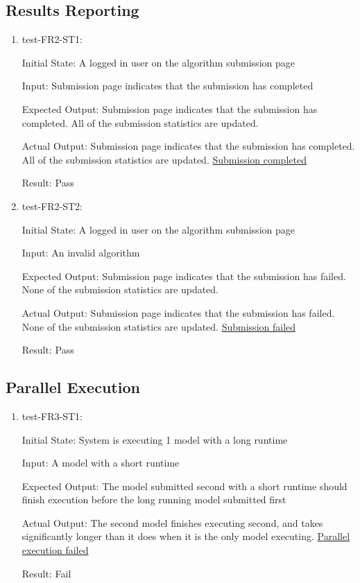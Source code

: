 \documentclass[12pt, titlepage]{article}
\begin{document}
\subsection{Results Reporting}
\begin{enumerate}
    \item test-FR2-ST1:\label{test-FR2-ST1}
    
    Initial State: A logged in user on the algorithm submission page
    
    Input: Submission page indicates that the submission has completed
    
    Expected Output: Submission page indicates that the submission has completed. All of the submission statistics are updated.
    
    Actual Output: Submission page indicates that the submission has completed. All of the submission statistics are updated. \href{https://github.com/AidanMariglia/SOCAlgoTestPlatform/blob/main/docs/VnVReport/images/submission_completed.png}{Submission completed}
    
    Result: Pass

    \item test-FR2-ST2:\label{test-FR2-ST2}
    
    Initial State: A logged in user on the algorithm submission page
    
    Input: An invalid algorithm
    
    Expected Output: Submission page indicates that the submission has failed. None of the submission statistics are updated.
    
    Actual Output: Submission page indicates that the submission has failed. None of the submission statistics are updated. \href{https://github.com/AidanMariglia/SOCAlgoTestPlatform/blob/main/docs/VnVReport/images/submission_failed.png}{Submission failed}
    
    Result: Pass
\end{enumerate}
\subsection{Parallel Execution}
\begin{enumerate}
    \item test-FR3-ST1:\label{test-FR3-ST1}

    Initial State: System is executing 1 model with a long runtime
    
    Input: A model with a short runtime
    
    Expected Output: The model submitted second with a short runtime should finish execution before the long running model submitted first
    
    Actual Output: The second model finishes executing second, and takes significantly longer than it does when it is the only model executing.
    \href{https://github.com/AidanMariglia/SOCAlgoTestPlatform/blob/main/docs/VnVReport/images/parallel_fail.png}{Parallel execution failed}
    
    Result:  Fail
\end{enumerate}
\end{document}
